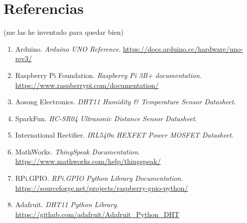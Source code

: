 \documentclass[12pt, a4paper]{article}
\begin{document}
\section{Referencias}

(me las he inventado para quedar bien)
\begin{enumerate}
    \item Arduino. \textit{Arduino UNO Reference}. \url{https://docs.arduino.cc/hardware/uno-rev3/}
    \item Raspberry Pi Foundation. \textit{Raspberry Pi 3B+ documentation}.
          \url{https://www.raspberrypi.com/documentation/}
    \item Aosong Electronics. \textit{DHT11 Humidity \& Temperature Sensor Datasheet}.
    \item SparkFun. \textit{HC-SR04 Ultrasonic Distance Sensor Datasheet}.
    \item International Rectifier. \textit{IRL540n HEXFET Power MOSFET Datasheet}.
    \item MathWorks. \textit{ThingSpeak Documentation}.
          \url{https://www.mathworks.com/help/thingspeak/}
    \item RPi.GPIO. \textit{RPi.GPIO Python Library Documentation}.
          \url{https://sourceforge.net/projects/raspberry-gpio-python/}
    \item Adafruit. \textit{DHT11 Python Library}.
          \url{https://github.com/adafruit/Adafruit\_Python\_DHT}
\end{enumerate}
\end{document}
